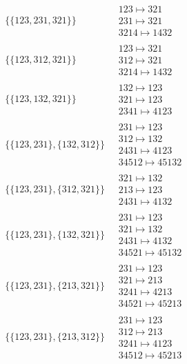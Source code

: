 \begin{scriptsize}
\begin{align}
\begin{matrix}
\end{matrix}
\\
\{\{123, 231, 321\}\}
\ 
&
\begin{matrix}
123 \mapsto 321\\231 \mapsto 321\\3214 \mapsto 1432
\end{matrix}
\\
\{\{123, 312, 321\}\}
\ 
&
\begin{matrix}
123 \mapsto 321\\312 \mapsto 321\\3214 \mapsto 1432
\end{matrix}
\\
\{\{123, 132, 321\}\}
\ 
&
\begin{matrix}
132 \mapsto 123\\321 \mapsto 123\\2341 \mapsto 4123
\end{matrix}
\\
\{\{123, 231\}, \{132, 312\}\}
\ 
&
\begin{matrix}
231 \mapsto 123\\312 \mapsto 132\\2431 \mapsto 4123\\34512 \mapsto 45132
\end{matrix}
\\
\{\{123, 231\}, \{312, 321\}\}
\ 
&
\begin{matrix}
321 \mapsto 132\\213 \mapsto 123\\2431 \mapsto 4132
\end{matrix}
\\
\{\{123, 231\}, \{132, 321\}\}
\ 
&
\begin{matrix}
231 \mapsto 123\\321 \mapsto 132\\2431 \mapsto 4132\\34521 \mapsto 45132
\end{matrix}
\\
\{\{123, 231\}, \{213, 321\}\}
\ 
&
\begin{matrix}
231 \mapsto 123\\321 \mapsto 213\\3241 \mapsto 4213\\34521 \mapsto 45213
\end{matrix}
\\
\{\{123, 231\}, \{213, 312\}\}
\ 
&
\begin{matrix}
231 \mapsto 123\\312 \mapsto 213\\3241 \mapsto 4123\\34512 \mapsto 45213

\end{matrix}
\end{align}
\end{scriptsize}
